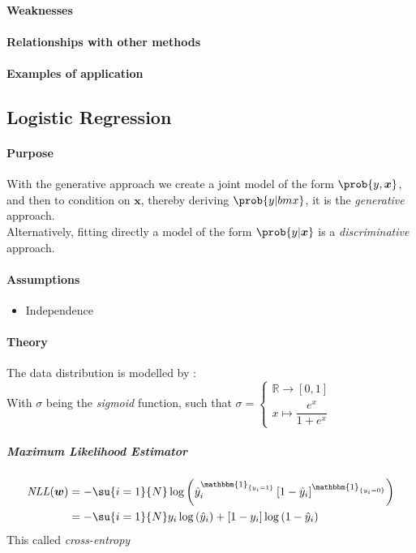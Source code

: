 \paragraph{Weaknesses}
\paragraph{Relationships with other methods}
\paragraph{Examples of application}


\subsection{Logistic Regression}
\paragraph{Purpose}
With the generative approach we create a joint model of the form $\prob{y,\bm{x}}$, and
then to condition on $\bm{x}$, thereby deriving $\prob{y|bm{x}}$, it is the \emph{
generative} approach.\\
Alternatively, fitting directly a model of the form $\prob{y|\bm{x}}$ is a \emph{
discriminative} approach.
\paragraph{Assumptions}
\begin{itemize}
    \item Independence
\end{itemize}

\paragraph{Theory}
The data distribution is modelled by : 
\\
With $\sigma$ being the \emph{sigmoid} function, such that 
$\sigma = \begin{cases}
    \mathbb{R} \longrightarrow [0, 1]\\ 
    x \mapsto \dfrac{e^{x}}{1 + e^{x}}
\end{cases}
$
\subparagraph{Maximum Likelihood Estimator}
\begin{align*}
    \text{\emph{NLL}}(\bm{w})
    &= -\su{i=1}{N}\log\left(\hat{y}_{i}^{\mathbbm{1}_{\{y_{i} = 1\}}}\left[1 -
    \hat{y}_{i}\right]^{\mathbbm{1}_{\{y_{i}=0\}}}\right)\\ 
    &= -\su{i=1}{N}y_{i}\log\left(\hat{y}_{i}\right) + \left[1 -y_{i}\right]\log
    \left(1 -\hat{y}_{i}\right)
\end{align*}
This called \textit{cross-entropy}


